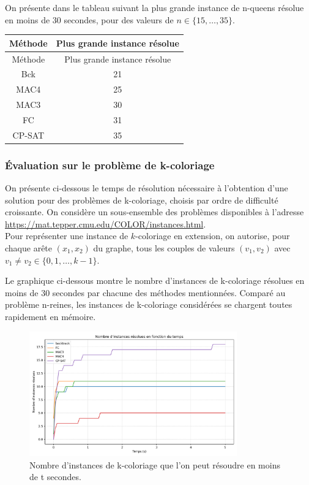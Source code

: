 \documentclass[14pt]{article}
\begin{document}
On présente dans le tableau suivant la plus grande instance de n-queens résolue en moins de 30 secondes, pour des valeurs de $n \in \{15,\dots,35\}$.

\begin{longtable}{|c|c|}
	\hline
	Méthode & Plus grande instance résolue \\
	\hline
	\endfirsthead

	Méthode & Plus grande instance résolue \\
	\hline
	\endhead

	\hline
	\endfoot

	\hline
	\endlastfoot

	Bck     & 21                           \\
	MAC4    & 25                           \\
	MAC3    & 30                           \\
	FC      & 31                           \\
	CP-SAT  & 35                           \\
\end{longtable}

\subsubsection{Évaluation sur le problème de k-coloriage}

On présente ci-dessous le temps de résolution nécessaire à l'obtention d'une solution pour des problèmes de k-coloriage, choisis par ordre de difficulté croissante. On considère un sous-ensemble des problèmes disponibles à l'adresse \href{https://mat.tepper.cmu.edu/COLOR/instances.html}{https://mat.tepper.cmu.edu/COLOR/instances.html}.\\

Pour représenter une instance de $k$-coloriage en extension, on autorise, pour chaque arête $(x_1,x_2)$ du graphe, tous les couples de valeurs $(v_1,v_2)$ avec $v_1 \neq v_2 \in \{0,1,\dots,k-1\}$.

Le graphique ci-dessous montre le nombre d'instances de k-coloriage résolues en moins de 30 secondes par chacune des méthodes mentionnées. Comparé au problème n-reines, les instances de k-coloriage considérées se chargent toutes rapidement en mémoire.

\begin{figure}[H]
	\centering
	\includegraphics[width=0.8\textwidth]{Images/coloring1.png}
	\caption{Nombre d'instances de k-coloriage que l'on peut résoudre en moins de t secondes.}
	\label{fig:coloring1}
\end{figure}
\end{document}
